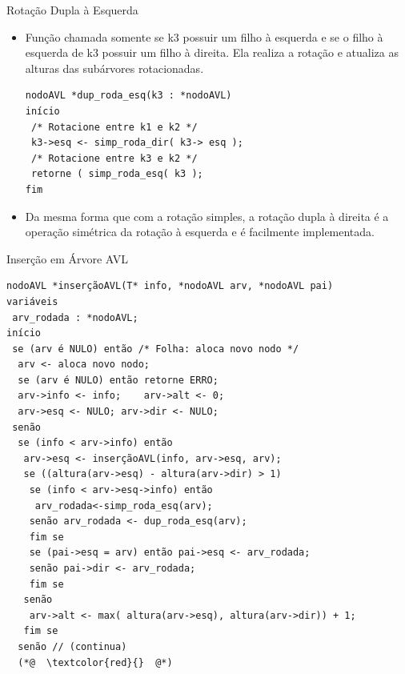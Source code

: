 \documentclass[12pt,table,xcolor={dvipsnames}]{beamer}
\begin{document}
\begin{frame}[fragile]{Rotação Dupla à Esquerda}
\begin{itemize}
\item Função chamada somente se k3 possuir um filho à esquerda e se o filho à esquerda de k3 possuir um filho à direita. Ela realiza a rotação e atualiza as alturas das subárvores rotacionadas.
\begin{lstlisting}
nodoAVL *dup_roda_esq(k3 : *nodoAVL) 
início                 
 /* Rotacione entre k1 e k2 */                 
 k3->esq <- simp_roda_dir( k3-> esq );
 /* Rotacione entre k3 e k2 */                 
 retorne ( simp_roda_esq( k3 );         
fim 
\end{lstlisting}
\item Da mesma forma que com a rotação simples, a rotação dupla à direita é a operação simétrica da rotação à esquerda e é facilmente implementada. 
\end{itemize}
\end{frame}

\begin{frame}[fragile]{Inserção em Árvore AVL}
\begin{lstlisting}
nodoAVL *inserçãoAVL(T* info, *nodoAVL arv, *nodoAVL pai)
variáveis
 arv_rodada : *nodoAVL;
início
 se (arv é NULO) então /* Folha: aloca novo nodo */
  arv <- aloca novo nodo;
  se (arv é NULO) então retorne ERRO;
  arv->info <- info;	arv->alt <- 0;
  arv->esq <- NULO;	arv->dir <- NULO;
 senão
  se (info < arv->info) então
   arv->esq <- inserçãoAVL(info, arv->esq, arv);
   se ((altura(arv->esq) - altura(arv->dir) > 1)
    se (info < arv->esq->info) então 
     arv_rodada<-simp_roda_esq(arv);
    senão arv_rodada <- dup_roda_esq(arv);
    fim se
    se (pai->esq = arv) então pai->esq <- arv_rodada;
    senão pai->dir <- arv_rodada;
    fim se
   senão
    arv->alt <- max( altura(arv->esq), altura(arv->dir)) + 1;
   fim se
  senão // (continua)
  (*@  \textcolor{red}{}  @*)
\end{lstlisting}
\end{frame}
\end{document}
